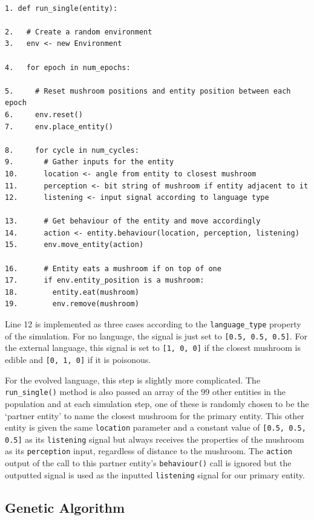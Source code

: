 \documentclass[12pt,a4paper,twoside,openright]{report}
\begin{document}
\begin{verbatim}

1. def run_single(entity):

2.   # Create a random environment
3.   env <- new Environment
  
4.   for epoch in num_epochs:

5.     # Reset mushroom positions and entity position between each epoch
6.     env.reset()
7.     env.place_entity()
  
8.     for cycle in num_cycles:
9.       # Gather inputs for the entity
10.      location <- angle from entity to closest mushroom
11.      perception <- bit string of mushroom if entity adjacent to it
12.      listening <- input signal according to language type
    
13.      # Get behaviour of the entity and move accordingly
14.      action <- entity.behaviour(location, perception, listening)
15.      env.move_entity(action)
      
16.      # Entity eats a mushroom if on top of one
17.      if env.entity_position is a mushroom:
18.        entity.eat(mushroom)
19.        env.remove(mushroom)

\end{verbatim}

Line 12 is implemented as three cases according to the \texttt{language\_type} property of the simulation. For no language, the signal is just set to \texttt{[0.5, 0.5, 0.5]}. For the external language, this signal is set to \texttt{[1, 0, 0]} if the closest mushroom is edible and \texttt{[0, 1, 0]} if it is poisonous.

For the evolved language, this step is slightly more complicated. The \texttt{run\_single()} method is also passed an array of the 99 other entities in the population and at each simulation step, one of these is randomly chosen to be the `partner entity' to name the closest mushroom for the primary entity. This other entity is given the same \texttt{location} parameter and a constant value of \texttt{[0.5, 0.5, 0.5]} as its \texttt{listening} signal but always receives the properties of the mushroom as its \texttt{perception} input, regardless of distance to the mushroom. The \texttt{action} output of the call to this partner entity's \texttt{behaviour()} call is ignored but the outputted signal is used as the inputted \texttt{listening} signal for our primary entity.

\subsection{Genetic Algorithm}
\end{document}
